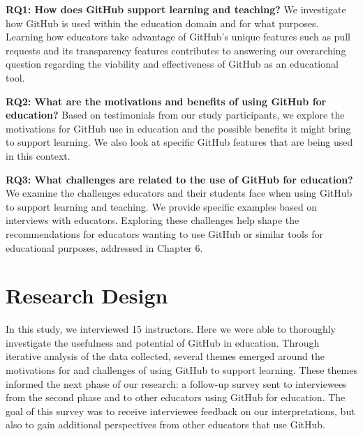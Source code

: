 \textbf{RQ1: How does GitHub support learning and teaching?} We investigate how GitHub is used within the education domain and for what purposes. Learning how educators take advantage of GitHub's unique features such as pull requests and its transparency features contributes to answering our overarching question regarding the viability and effectiveness of GitHub as an educational tool. %

\textbf{RQ2: What are the motivations and benefits of using GitHub for education?} Based on testimonials from our study participants, we explore the motivations for GitHub use in education and the possible benefits it might bring to support learning. We also look at specific GitHub features that are being used in this context.

\textbf{RQ3: What challenges are related to the use of GitHub for education?} We examine the challenges educators and their students face when using GitHub to support learning and teaching. We provide specific examples based on interviews with educators. Exploring these challenges help shape the recommendations for educators wanting to use GitHub or similar tools for educational purposes, addressed in Chapter 6.

\section{Research Design}

In this study, we interviewed 15 instructors. Here we were able to thoroughly investigate the usefulness and potential of GitHub in education. Through iterative analysis of the data collected, several themes emerged around the motivations for and challenges of using GitHub to support learning. These themes informed the next phase of our research: a follow-up survey sent to interviewees from the second phase and to other educators using GitHub for education. The goal of this survey was to receive interviewee feedback on our interpretations, but also to gain additional perspectives from other educators that use GitHub.

